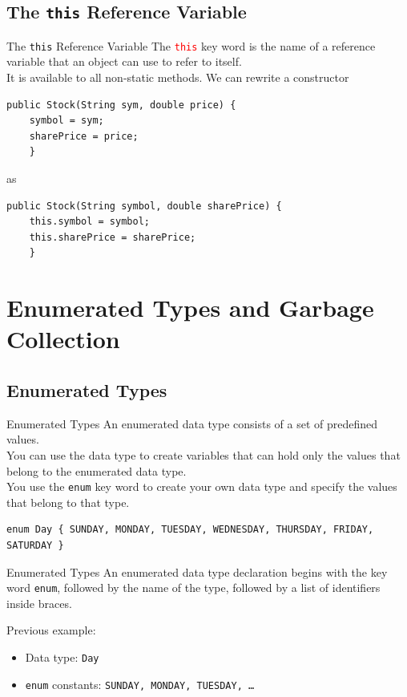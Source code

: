 \documentclass[11pt]{beamer}
\newcommand{\red}[1]{\textcolor{red}{#1}}
\begin{document}
\subsection{The \texttt{this} Reference Variable}
\begin{frame}[fragile]{The \texttt{this} Reference Variable}
    The \red{\texttt{this}} key word is the name of a reference variable that an object can use to refer to itself. \\ \vspace{1em}
    It is available to all non-static methods.
    We can rewrite a constructor
\begin{lstlisting}
public Stock(String sym, double price) {
    symbol = sym;
    sharePrice = price;
    }
\end{lstlisting}
as
\begin{lstlisting}
public Stock(String symbol, double sharePrice) {
    this.symbol = symbol;
    this.sharePrice = sharePrice;
    }
\end{lstlisting}
\end{frame}

\section{Enumerated Types and Garbage Collection}
\subsection{Enumerated Types}
\begin{frame}[fragile]{Enumerated Types}
    An enumerated data type consists of a set of predefined values. \\ \vspace{1em}
    You can use the data type to create variables that can hold only the values that belong to the enumerated data type. \\ \vspace{1em}
    You use the \texttt{enum} key word to create your own data type and specify the values that belong to that type.
    \begin{lstlisting}
enum Day { SUNDAY, MONDAY, TUESDAY, WEDNESDAY, THURSDAY, FRIDAY, SATURDAY }
    \end{lstlisting}    
\end{frame}

\begin{frame}[fragile]{Enumerated Types}
    An enumerated data type declaration begins with the key word \texttt{enum}, followed by the name of the type, followed by a list of identifiers inside braces. \\ \vspace{1em}

    Previous example:
    \begin{itemize}
        \item Data type: \texttt{Day}
        \item \texttt{enum} constants: \texttt{SUNDAY, MONDAY, TUESDAY, \ldots}
    \end{itemize}
\end{frame}
\end{document}
